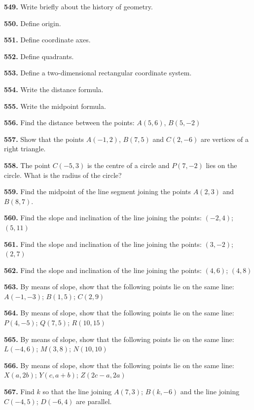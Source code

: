 \documentclass[11pt]{article}
\begin{document}
\bigskip
\noindent\textbf{549.} Write briefly about the history of geometry.

\bigskip
\noindent\textbf{550.} Define origin.

\bigskip
\noindent\textbf{551.} Define coordinate axes.

\bigskip
\noindent\textbf{552.} Define quadrants.

\bigskip
\noindent\textbf{553.} Define a two-dimensional rectangular coordinate system.

\bigskip
\noindent\textbf{554.} Write the distance formula.

\bigskip
\noindent\textbf{555.} Write the midpoint formula.

\bigskip
\noindent\textbf{556.} Find the distance between the points: $A(5,6)$, $B(5,-2)$

\bigskip
\noindent\textbf{557.} Show that the points $A(-1,2)$, $B(7,5)$ and $C(2,-6)$ are vertices of a right triangle.

\bigskip
\noindent\textbf{558.} The point $C(-5,3)$ is the centre of a circle and $P(7,-2)$ lies on the circle. What is the radius of the circle?

\bigskip
\noindent\textbf{559.} Find the midpoint of the line segment joining the points $A(2,3)$ and $B(8,7)$.

\bigskip
\noindent\textbf{560.} Find the slope and inclination of the line joining the points: $(-2,4)$; $(5,11)$

\bigskip
\noindent\textbf{561.} Find the slope and inclination of the line joining the points: $(3,-2)$; $(2,7)$

\bigskip
\noindent\textbf{562.} Find the slope and inclination of the line joining the points: $(4,6)$; $(4,8)$

\bigskip
\noindent\textbf{563.} By means of slope, show that the following points lie on the same line: $A(-1,-3)$; $B(1,5)$; $C(2,9)$

\bigskip
\noindent\textbf{564.} By means of slope, show that the following points lie on the same line: $P(4,-5)$; $Q(7,5)$; $R(10,15)$

\bigskip
\noindent\textbf{565.} By means of slope, show that the following points lie on the same line: $L(-4,6)$; $M(3,8)$; $N(10,10)$

\bigskip
\noindent\textbf{566.} By means of slope, show that the following points lie on the same line: $X(a,2b)$; $Y(c,a+b)$; $Z(2c-a,2a)$

\bigskip
\noindent\textbf{567.} Find $k$ so that the line joining $A(7,3)$; $B(k,-6)$ and the line joining $C(-4,5)$; $D(-6,4)$ are parallel.
\end{document}
